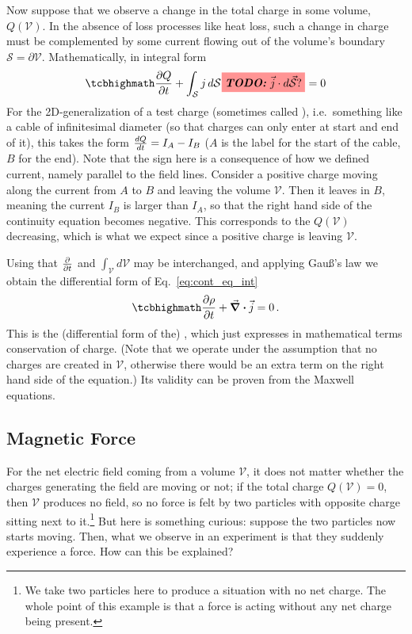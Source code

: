 \documentclass[../class_mech_main.tex]{subfiles}
\begin{document}
Now suppose that we observe a change in the total charge in some volume, $Q(\mathcal{V})$. In the absence of loss processes like heat loss, such a change in charge must be complemented by some current flowing out of the volume's boundary $\mathcal{S} = \partial \mathcal{V}$. Mathematically, in integral form
\begin{equation}\label{eq:cont_eq_int}
    \eqbox{
        \pdv{Q}{t} + \int_\mathcal{S} j \, d\mathcal{S} \todo{$\vec{j} \cdot d\vec{\mathcal{S}}$?} = 0
    }
\end{equation}
For the 2D-generalization of a test charge (sometimes called ), i.e.~something like a cable of infinitesimal diameter (so that charges can only enter at start and end of it), this takes the form $\dv{Q}{t} = I_A - I_B$ ($A$ is the label for the start of the cable, $B$ for the end). Note that the sign here is a consequence of how we defined current, namely parallel to the field lines. Consider a positive charge moving along the current from $A$ to $B$ and leaving the volume $\mathcal{V}$. Then it leaves in $B$, meaning the current $I_B$ is larger than $I_A$, so that the right hand side of the continuity equation becomes negative. This corresponds to the $Q(\mathcal{V})$ decreasing, which is what we expect since a positive charge is leaving $\mathcal{V}$.


Using that $\pdv{t}$ and $\int_\mathcal{V} d\mathcal{V}$ may be interchanged, and applying Gauß's law we obtain the differential form of Eq.~\eqref{eq:cont_eq_int}
\begin{equation}\label{eq:cont_eq_diff}
    \eqbox{
        \pdv{\rho}{t} + \div \vec{j} = 0
    } \, .
\end{equation}
This is the (differential form of the) , which just expresses in mathematical terms conservation of charge. (Note that we operate under the assumption that no charges are created in $\mathcal{V}$, otherwise there would be an extra term on the right hand side of the equation.) Its validity can be proven from the Maxwell equations.





        \subsection{Magnetic Force}
For the net electric field coming from a volume $\mathcal{V}$, it does not matter whether the charges generating the field are moving or not; if the total charge $Q(\mathcal{V}) = 0$, then $\mathcal{V}$ produces no field, so no force is felt by two particles with opposite charge sitting next to it.\footnote{We take two particles here to produce a situation with no net charge. The whole point of this example is that a force is acting without any net charge being present.} But here is something curious: suppose the two particles now starts moving. Then, what we observe in an experiment is that they suddenly experience a force. How can this be explained?
\end{document}
